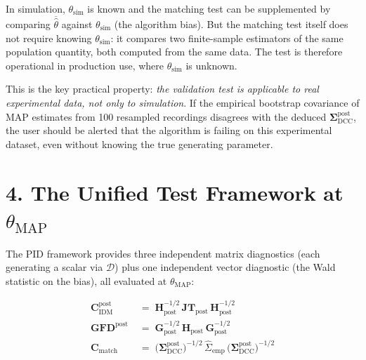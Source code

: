 \documentclass[11pt]{article}
\begin{document}
In simulation, $\theta_{\mathrm{sim}}$ is known and the matching test
can be supplemented by comparing $\overline{\widehat\theta}$ against
$\theta_{\mathrm{sim}}$ (the algorithm bias). But the matching test
itself does not require knowing $\theta_{\mathrm{sim}}$: it compares
two finite-sample estimators of the same population quantity, both
computed from the same data. The test is therefore operational in
production use, where $\theta_{\mathrm{sim}}$ is unknown.

This is the key practical property: \emph{the validation test is
applicable to real experimental data, not only to simulation}. If the
empirical bootstrap covariance of MAP estimates from 100 resampled
recordings disagrees with the deduced
$\boldsymbol\Sigma_{\mathrm{DCC}}^{\mathrm{post}}$, the user should be
alerted that the algorithm is failing on this experimental dataset,
even without knowing the true generating parameter.

\section*{4. The Unified Test Framework at $\theta_{\mathrm{MAP}}$}
\label{sec:av-trio}

The PID framework provides three independent matrix diagnostics
(each generating a scalar via $\mathcal D$) plus one independent
vector diagnostic (the Wald statistic on the bias), all evaluated at
$\theta_{\mathrm{MAP}}$:

\begin{align}
\mathbf C_{\mathrm{IDM}}^{\mathrm{post}}
\;&=\;
\mathbf H_{\mathrm{post}}^{-1/2}\,\mathbf{JT}_{\mathrm{post}}\,\mathbf H_{\mathrm{post}}^{-1/2}
\label{eq:av-C-IDM-post}\\[4pt]
\mathbf{GFD}^{\mathrm{post}}
\;&=\;
\mathbf G_{\mathrm{post}}^{-1/2}\,\mathbf H_{\mathrm{post}}\,\mathbf G_{\mathrm{post}}^{-1/2}
\label{eq:av-GFD-post}\\[4pt]
\mathbf C_{\mathrm{match}}
\;&=\;
\bigl(\boldsymbol\Sigma_{\mathrm{DCC}}^{\mathrm{post}}\bigr)^{-1/2}\,
\widehat\Sigma_{\mathrm{emp}}\,
\bigl(\boldsymbol\Sigma_{\mathrm{DCC}}^{\mathrm{post}}\bigr)^{-1/2}
\label{eq:av-C-match-restated}
\end{align}
\end{document}
